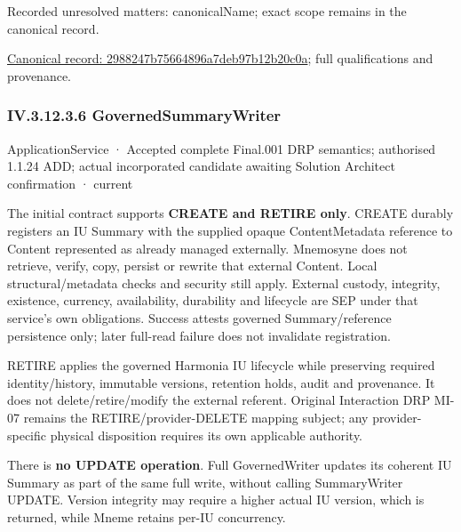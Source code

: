 {\small Recorded unresolved matters: canonicalName; exact scope remains in the canonical record.}\par
{\footnotesize \href{../../../../continuum/application/application-service/2988247b75664896a7deb97b12b20c0a.md}{Canonical record: 2988247b75664896a7deb97b12b20c0a}; full qualifications and provenance.}\par
\subsubsection*{IV.3.12.3.6 GovernedSummaryWriter}
\label{navigation:IV.3.12.3.6}

\label{element:bffb611e29844eedaf39a5b27ccbbcc7}
{\small ApplicationService · Accepted complete Final.001 DRP semantics; authorised 1.1.24 ADD; actual incorporated candidate awaiting Solution Architect confirmation · current}\par

The initial contract supports \textbf{CREATE and RETIRE only}. CREATE durably registers an IU Summary with the supplied opaque ContentMetadata reference to Content represented as already managed externally. Mnemosyne does not retrieve, verify, copy, persist or rewrite that external Content. Local structural/metadata checks and security still apply. External custody, integrity, existence, currency, availability, durability and lifecycle are SEP under that service's own obligations. Success attests governed Summary/reference persistence only; later full-read failure does not invalidate registration.



RETIRE applies the governed Harmonia IU lifecycle while preserving required identity/history, immutable versions, retention holds, audit and provenance. It does not delete/retire/modify the external referent. Original Interaction DRP MI-07 remains the RETIRE/provider-DELETE mapping subject; any provider-specific physical disposition requires its own applicable authority.



There is \textbf{no UPDATE operation}. Full GovernedWriter updates its coherent IU Summary as part of the same full write, without calling SummaryWriter UPDATE. Version integrity may require a higher actual IU version, which is returned, while Mneme retains per-IU concurrency.



